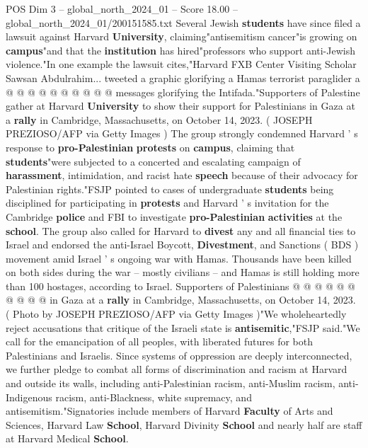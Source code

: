 \begin{textsample}{POS Dim 3 – global\_north\_2024\_01 – Score 18.00 – global\_north\_2024\_01/200151585.txt}
Several Jewish \textbf{students} have since filed a lawsuit against Harvard \textbf{University}, claiming"antisemitism cancer"is growing on \textbf{campus}"and that the \textbf{institution} has hired"professors who support anti-Jewish violence."In one example the lawsuit cites,"Harvard FXB Center Visiting Scholar Sawsan Abdulrahim... tweeted a graphic glorifying a Hamas terrorist paraglider a @ @ @ @ @ @ @ @ @ @ messages glorifying the Intifada."Supporters of Palestine gather at Harvard \textbf{University} to show their support for Palestinians in Gaza at a \textbf{rally} in Cambridge, Massachusetts, on October 14, 2023. ( JOSEPH PREZIOSO/AFP via Getty Images ) The group strongly condemned Harvard ' s response to \textbf{pro-Palestinian} \textbf{protests} on \textbf{campus}, claiming that \textbf{students}"were subjected to a concerted and escalating campaign of \textbf{harassment}, intimidation, and racist hate \textbf{speech} because of their advocacy for Palestinian rights."FSJP pointed to cases of undergraduate \textbf{students} being disciplined for participating in \textbf{protests} and Harvard ' s invitation for the Cambridge \textbf{police} and FBI to investigate \textbf{pro-Palestinian} \textbf{activities} at the \textbf{school}.
The group also called for Harvard to \textbf{divest} any and all financial ties to Israel and endorsed the anti-Israel Boycott, \textbf{Divestment}, and Sanctions ( BDS ) movement amid Israel ' s ongoing war with Hamas.
Thousands have been killed on both sides during the war -- mostly civilians -- and Hamas is still holding more than 100 hostages, according to Israel.
Supporters of Palestinians @ @ @ @ @ @ @ @ @ @ in Gaza at a \textbf{rally} in Cambridge, Massachusetts, on October 14, 2023. ( Photo by JOSEPH PREZIOSO/AFP via Getty Images )"We wholeheartedly reject accusations that critique of the Israeli state is \textbf{antisemitic},"FSJP said."We call for the emancipation of all peoples, with liberated futures for both Palestinians and Israelis.
Since systems of oppression are deeply interconnected, we further pledge to combat all forms of discrimination and racism at Harvard and outside its walls, including anti-Palestinian racism, anti-Muslim racism, anti-Indigenous racism, anti-Blackness, white supremacy, and antisemitism."Signatories include members of Harvard \textbf{Faculty} of Arts and Sciences, Harvard Law \textbf{School}, Harvard Divinity \textbf{School} and nearly half are staff at Harvard Medical \textbf{School}.

\end{textsample}
